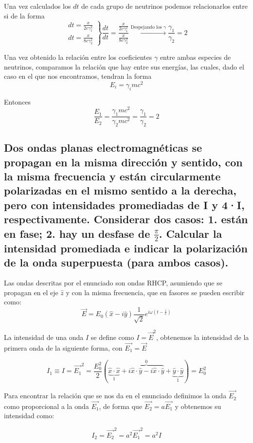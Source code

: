 \documentclass{article}
\begin{document}
Una vez calculados los $dt$ de cada grupo de neutrinos podemos relacionarlos entre si de la forma
\[\left.\begin{aligned}
  dt=\frac{x}{2c\gamma_{1}^{2}}\\
  dt=\frac{x}{8c\gamma_{2}^{2}}
\end{aligned}\right\}\frac{dt}{dt}=\frac{\frac{x}{2c\gamma_{1}^{2}}}{\frac{x}{8c\gamma_{2}^{2}}}\xrightarrow{\text{Despejando los }\gamma}\frac{\gamma_{1}}{\gamma_{2}}=2\] 

Una vez obtenido la relación entre los coeficientes $\gamma$ entre ambas especies de neutrinos, comparamos la relación que hay entre sus energías, las cuales, dado el caso en el que nos encontramos, tendran la forma 
\[E_{i}=\gamma_{i}mc^{2}\]

Entonces 
\[\frac{E_{1}}{E_{2}}=\frac{\gamma_{1}mc^{2}}{\gamma_{2}mc^{2}}=\frac{\gamma_{1}}{\gamma_{2}}=2\]
\subsection{Dos ondas planas electromagnéticas se propagan en la misma dirección y sentido, con la misma frecuencia y están circularmente polarizadas en el mismo sentido a la derecha, pero con intensidades promediadas de I y 4·I, respectivamente. Considerar dos casos: 1. están en fase; 2. hay un desfase de $\frac{\pi}{2}$.
Calcular la intensidad promediada e indicar la polarización de la onda superpuesta (para ambos casos).}

Las ondas descritas por el enunciado son ondas RHCP, asumiendo que se propagan en el eje $\hat{z}$ y con la misma frecuencia, que en fasores se pueden escribir como:
\[\vec{E}=E_{0}(\hat{x}-i\hat{y}) \frac{1}{\sqrt{2}}e^{i\omega(t-\frac{z}{c})}\]

La intensidad de una onda $I$ se define como $I=\vec{E}^{2}$, obtenemos la intensidad de la primera onda de la siguiente forma, con $\vec{E_{1}}=\vec{E}$

\[I_{1}\equiv I=\vec{E_{1}}^{2}=\frac{E_{0}^{2}}{2}(\underbrace{\hat{x}\cdot \hat{x}}_{1}+\overbrace{i \hat{x}\cdot \hat{y}- i \hat{x}\cdot \hat{y}}^{0}+\underbrace{\hat{y}\cdot \hat{y}}_{1})=E_{0}^{2}\]

Para encontrar la relación que se nos da en el enunciado definimos la onda $\vec{E_{2}}$ como proporcional a la onda $\vec{E_{1}}$, de forma que $\vec{E_{2}}=a \vec{E_{1}}$ y obtenemos su intensidad como:

\[I_{2}= \vec{E_{2}}^{2}=a^{2} \vec{E_{1}}^{2}= a^{2}I\]
\end{document}
